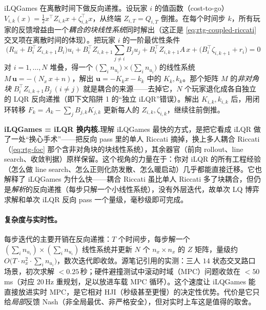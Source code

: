 iLQGames 在离散时间下做反向递推。设玩家 $i$ 的值函数（cost-to-go）$V_{i,k}(x)=\tfrac12 x^\top Z_{i,k}x+\zeta_{i,k}^\top x$，从终端 $Z_{i,T}=Q_{i,T}$ 倒推。在每个时间步 $k$，所有玩家的反馈增益由一个\emph{耦合的块线性系统}同时解出（这正是 \cref{eq:rtg-coupled-riccati} 交叉项在离散时间的体现）。把玩家 $i$ 的一阶最优性条件
\begin{equation}
  \big(R_{ii}+B_i^\top Z_{i,k+1}B_i\big)u_i+B_i^\top Z_{i,k+1}\sum_{j\ne i}B_ju_j+B_i^\top Z_{i,k+1}A\,x+\big(B_i^\top\zeta_{i,k+1}+r_i\big)=0
  \label{eq:rtg-foc}
\end{equation}
对 $i=1,\dots,N$ 堆叠，得一个 $\big(\sum_i n_{u_i}\big)\times\big(\sum_i n_{u_i}\big)$ 的线性系统 $M\,\mathbf{u}=-(N_x\,x+n)$，解出 $\mathbf{u}=-K_k x-k_k$ 中的 $K_k,k_k$。那个矩阵 $M$ 的\emph{非对角块} $B_i^\top Z_{i,k+1}B_j\,(i\ne j)$ 就是耦合的来源——去掉它，$N$ 个玩家退化成各自独立的 LQR 反向递推（即下文陷阱 1 的“独立 iLQR”错误）。解出 $K_{i,k},k_{i,k}$ 后，用闭环转移 $F_k=A_k-\sum_j B_{j,k}K_{j,k}$ 更新每人的 $Z_{i,k},\zeta_{i,k}$，继续往前倒推。

\begin{insight}
\textbf{iLQGames = iLQR 换内核.}\;理解 iLQGames 最快的方式，是把它看成 iLQR 做了一处“换心手术”——把反向 pass 里的单人 Riccati 摘掉，换上多人耦合 Riccati（\cref{eq:rtg-foc} 那个含非对角块的块线性系统），其余器官（前向 rollout、line search、收敛判据）原样保留。这个视角的力量在于：你对 iLQR 的所有工程经验（怎么做 line search、怎么正则化防发散、怎么暖启动）几乎都能直接迁移。它也解释了 iLQGames 为什么快——耦合 Riccati 虽比单人 Riccati 多了块耦合，但仍是\emph{解析}的反向递推（每步只解一个小线性系统），没有外层迭代，故单次 LQ 博弈求解和单次 iLQR 反向 pass 一个量级，毫秒级即可完成。
\end{insight}

\paragraph{复杂度与实时性。}
每步迭代的主要开销在反向递推：$T$ 个时间步，每步解一个 $(\sum_i n_{u_i})\times(\sum_i n_{u_i})$ 线性系统并更新 $N$ 个 $n_x\times n_x$ 的 $Z$ 矩阵，量级约 $O\big(T\cdot n_x^2\cdot\sum_i n_{u_i}\big)$，数次迭代即收敛。源笔记引用的实测：三人 $14$ 状态交叉路口场景，初次求解 $<0.25$\,秒；硬件避撞测试中滚动时域（MPC）问题收敛在 $<50$\,ms（对应 $20$\,Hz 重规划，足以放进车载 MPC 循环）\cite{fridovich2020efficient}。这个速度让 iLQGames 能直接放进实时 MPC，是它相对 HJI（秒级甚至更慢）的决定性优势。代价是它只给\emph{局部}反馈 Nash（非全局最优、非严格安全），但对实时上车这是值得的取舍。

